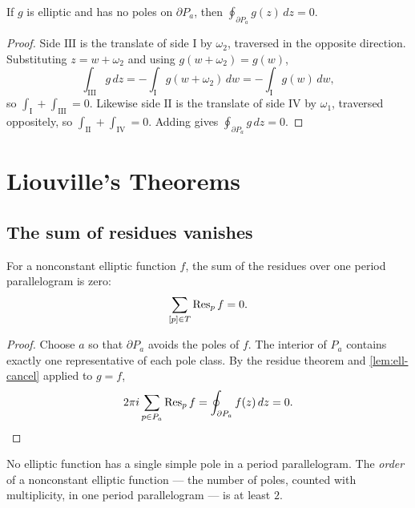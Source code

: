 \begin{lemma}
\label{lem:ell-cancel}
If \(g\) is elliptic and has no poles on \(\partial P_a\), then
\(\oint_{\partial P_a} g(z)\,dz = 0\).
\end{lemma}

\begin{proof}
Side \(\mathrm{III}\) is the translate of side \(\mathrm{I}\) by \(\omega_2\),
traversed in the opposite direction. Substituting \(z = w + \omega_2\) and using
\(g(w+\omega_2) = g(w)\),
\[
  \int_{\mathrm{III}} g\,dz
  = -\int_{\mathrm{I}} g(w+\omega_2)\,dw
  = -\int_{\mathrm{I}} g(w)\,dw ,
\]
so \(\int_{\mathrm{I}} + \int_{\mathrm{III}} = 0\). Likewise side
\(\mathrm{II}\) is the translate of side \(\mathrm{IV}\) by \(\omega_1\), traversed
oppositely, so \(\int_{\mathrm{II}} + \int_{\mathrm{IV}} = 0\). Adding gives
\(\oint_{\partial P_a} g\,dz = 0\).
\end{proof}

\section{Liouville's Theorems}
\label{sec:ell-liouville}

\subsection{The sum of residues vanishes}

\begin{theorem}
\label{thm:ell-residues}
For a nonconstant elliptic function \(f\), the sum of the residues over one
period parallelogram is zero:
\[
  \sum_{[p] \in T} \operatorname{Res}_{p} f = 0 .
\]
\end{theorem}

\begin{proof}
Choose \(a\) so that \(\partial P_a\) avoids the poles of \(f\). The interior of
\(P_a\) contains exactly one representative of each pole class. By the residue
theorem and \cref{lem:ell-cancel} applied to \(g = f\),
\[
  2\pi i \sum_{p \in P_a} \operatorname{Res}_p f
  = \oint_{\partial P_a} f(z)\,dz = 0 . \qedhere
\]
\end{proof}

\begin{corollary}
\label{cor:ell-order2}
No elliptic function has a single simple pole in a period parallelogram. The
\emph{order} of a nonconstant elliptic function --- the number of poles, counted
with multiplicity, in one period parallelogram --- is at least \(2\).
\end{corollary}

